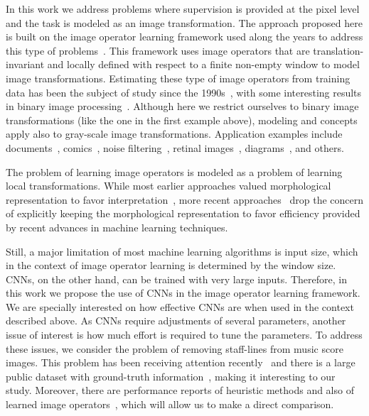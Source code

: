 \documentclass[conference]{IEEEtran}
\begin{document}
In this work we address problems where supervision is provided at the
pixel level and the task is modeled as an image transformation. 
The approach proposed here is built on the image operator learning
framework used along the years to address this type of
problems~\cite{2016:tutorialSIB,1997:BarDoughTom,2009:Nina}. This
framework uses image operators that are translation-invariant and
locally defined with respect to a finite non-empty window to model
image transformations. Estimating these type of image operators from
training data has been the subject of study since the
1990s~\cite{Dough:92a,1997:BarDoughTom,Yoo:99}, with some interesting
results in binary image processing~\cite{2009:Nina,2017:IgorPR}.
Although here we restrict ourselves to binary image transformations
(like the one in the first example above), modeling and concepts apply
also to gray-scale image transformations. Application examples
include documents~\cite{2000:hirbarter,2016:tutorialSIB},
comics~\cite{2016:ninamanpu}, noise
filtering~\cite{CoyleLin:88,Yoo:99}, retinal
images~\cite{Benalcazar2013,2016:IgorSIB}, diagrams~\cite{2009:Nina}, and others.

The problem of learning image operators is modeled as a
problem of learning local transformations. While most earlier
approaches valued morphological representation to favor
interpretation~\cite{Dough:92a,1997:BarDoughTom,2009:Nina}, more
recent approaches~\cite{Benalcazar2013,2016:IgorICIP,2016:IgorSIB} drop the concern
of explicitly keeping the morphological representation to favor
efficiency provided by recent advances in machine learning techniques.

Still, a major limitation of most machine learning algorithms is input
size, which in the context of image operator learning is determined
by the window size. CNNs, on the other hand, can be trained with very large
inputs. Therefore, in this work we propose the use of CNNs in the
image operator learning framework. We are specially interested on how
effective CNNs are when used in the context described above. As CNNs
require adjustments of several parameters, another issue of interest
is how much effort is required to tune the parameters.
To address these issues, we consider the problem of removing
staff-lines from music score images. This problem has been receiving
attention recently~\cite{CompoICDAR2013,Dalitz08,Calvo-Zaragoza2016}
and there is a large public dataset with ground-truth
information~\cite{CompoICDAR2013}, making it interesting to our study.
Moreover, there are performance reports of heuristic methods and also
of learned image operators~\cite{2017:IgorPR}, which will allow us to
make a direct comparison.
\end{document}

